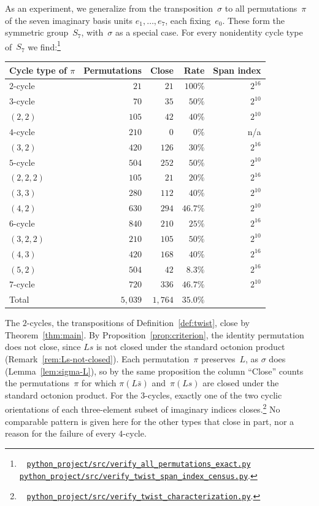 \documentclass[twoside,english]{paper}
\numberwithin{equation}{section}
\numberwithin{figure}{section}
\theoremstyle{definition}
\theoremstyle{remark}
\newcommand{\scriptref}[1]{\cite{repo}~%
  \href{https://github.com/koeplinger/leech\_alg/blob/main/python\_project/src/#1}%
  {\nolinkurl{python_project/src/#1}}}
\begin{document}
As an experiment, we generalize from the transposition~$\sigma$ to all
permutations~$\pi$ of the seven imaginary basis units
$e_1, \ldots, e_7$, each fixing~$e_0$.  These form the symmetric
group~$S_7$, with~$\sigma$ as a special case.  For every nonidentity cycle type
of~$S_7$ we find:\footnote{\scriptref{verify\_all\_permutations\_exact.py}
\scriptref{verify\_twist\_span\_index\_census.py}.}
\begin{center}
\begin{tabular}{@{}lrrrr@{}}
\toprule
Cycle type of $\pi$ & Permutations & Close & Rate & Span index \\
\midrule
$2$-cycle     & $21$  & $21$  & $100\%$  & $2^{16}$ \\
$3$-cycle     & $70$  & $35$  & $50\%$   & $2^{10}$ \\
$(2,2)$       & $105$ & $42$  & $40\%$   & $2^{10}$ \\
$4$-cycle     & $210$ & $0$   & $0\%$    & n/a \\
$(3,2)$       & $420$ & $126$ & $30\%$   & $2^{16}$ \\
$5$-cycle     & $504$ & $252$ & $50\%$   & $2^{10}$ \\
$(2,2,2)$     & $105$ & $21$  & $20\%$   & $2^{16}$ \\
$(3,3)$       & $280$ & $112$ & $40\%$   & $2^{10}$ \\
$(4,2)$       & $630$ & $294$ & $46.7\%$ & $2^{10}$ \\
$6$-cycle     & $840$ & $210$ & $25\%$   & $2^{16}$ \\
$(3,2,2)$     & $210$ & $105$ & $50\%$   & $2^{10}$ \\
$(4,3)$       & $420$ & $168$ & $40\%$   & $2^{16}$ \\
$(5,2)$       & $504$ & $42$  & $8.3\%$  & $2^{16}$ \\
$7$-cycle     & $720$ & $336$ & $46.7\%$ & $2^{10}$ \\
\midrule
Total         & $5{,}039$ & $1{,}764$ & $35.0\%$ & \\
\bottomrule
\end{tabular}
\end{center}
The $2$-cycles, the transpositions of Definition~\ref{def:twist},
close by Theorem~\ref{thm:main}.  By Proposition~\ref{prop:criterion},
the identity permutation does not close, since $Ls$ is not closed
under the standard octonion product (Remark~\ref{rem:Ls-not-closed}).
Each permutation~$\pi$ preserves~$L$, as $\sigma$ does
(Lemma~\ref{lem:sigma-L}), so by the same proposition the column
``Close'' counts the permutations~$\pi$ for which $\pi(L\bar s)$
and~$\pi(Ls)$ are closed under the standard octonion product.  For the
$3$-cycles, exactly one of the two cyclic orientations of each
three-element subset of imaginary indices
closes.\footnote{\scriptref{verify\_twist\_characterization.py}.}  No
comparable pattern is given here for the other types that close in part,
nor a reason for the failure of every $4$-cycle.
\end{document}
